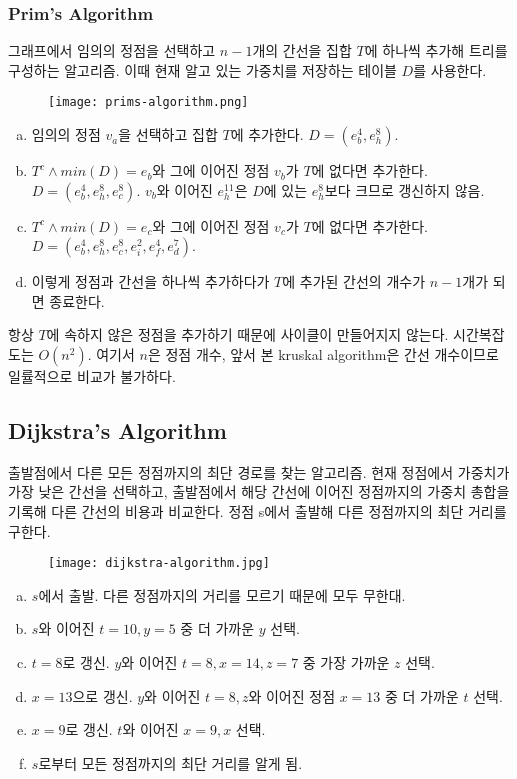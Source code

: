 \subsubsection{Prim's Algorithm}

그래프에서 임의의 정점을 선택하고 $n - 1$개의 간선을 집합 $T$에 하나씩 추가해 트리를 구성하는 알고리즘. 이때 현재 알고 있는 가중치를 저장하는 테이블 $D$를 사용한다.

\begin{figure}[h]
  \centering
  \texttt{[image: prims-algorithm.png]}
\end{figure}

\begin{enumerate}[(a)]
  \item 임의의 정점 $v_a$을 선택하고 집합 $T$에 추가한다. $D = (e_b^4, e_h^8)$.
  \item $T^c \land min(D) = e_b$와 그에 이어진 정점 $v_b$가 $T$에 없다면 추가한다. $D = (e_b^4, e_h^8, e_c^8)$. $v_b$와 이어진 $e_h^{11}$은 $D$에 있는 $e_h^8$보다 크므로 갱신하지 않음.
  \item $T^c \land min(D) = e_c$와 그에 이어진 정점 $v_c$가 $T$에 없다면 추가한다. $D = (e_b^4, e_h^8, e_c^8, e_i^2, e_f^4, e_d^7)$.
  \item 이렇게 정점과 간선을 하나씩 추가하다가 $T$에 추가된 간선의 개수가 $n - 1$개가 되면 종료한다.
\end{enumerate}

항상 $T$에 속하지 않은 정점을 추가하기 때문에 사이클이 만들어지지 않는다. 시간복잡도는 $O(n^2)$. 여기서 $n$은 정점 개수, 앞서 본 kruskal algorithm은 간선 개수이므로 일률적으로 비교가 불가하다.

\subsection{Dijkstra's Algorithm}

출발점에서 다른 모든 정점까지의 최단 경로를 찾는 알고리즘. 현재 정점에서 가중치가 가장 낮은 간선을 선택하고, 출발점에서 해당 간선에 이어진 정점까지의 가중치 총합을 기록해 다른 간선의 비용과 비교한다. 정점 s에서 출발해 다른 정점까지의 최단 거리를 구한다.

\begin{figure}[h]
  \centering
  \texttt{[image: dijkstra-algorithm.jpg]}
\end{figure}

\begin{enumerate}[(a)]
  \item $s$에서 출발. 다른 정점까지의 거리를 모르기 때문에 모두 무한대.
  \item $s$와 이어진 $t=10, y=5$ 중 더 가까운 $y$ 선택.
  \item $t=8$로 갱신. $y$와 이어진 $t=8, x=14, z=7$ 중 가장 가까운 $z$ 선택.
  \item $x=13$으로 갱신. $y$와 이어진 $t=8, z$와 이어진 정점 $x=13$ 중 더 가까운 $t$ 선택.
  \item $x=9$로 갱신. $t$와 이어진 $x=9, x$ 선택.
  \item $s$로부터 모든 정점까지의 최단 거리를 알게 됨.
\end{enumerate}

